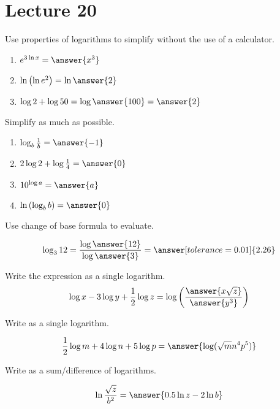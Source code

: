 \documentclass{ximera}
\begin{document}
 \section{Lecture 20}
 
  \begin{problem}\label{prob:160hom8prob1} 
Use properties of logarithms to simplify without the use of a calculator.
\begin{enumerate}
    \item $e^{3\ln x}=\answer{x^3}$
    \item $\ln\left(\ln e^2\right)=\ln\answer{2}$
    \item $\log 2 +\log 50=\log \answer{100}=\answer{2}$
\end{enumerate}
\end{problem}

\begin{problem}\label{prob:160hom8prob8}
 Simplify as much as possible.
 \begin{enumerate}
     \item $\log_b \frac{1}{b}=\answer{-1}$
     \item $2\log 2+\log\frac{1}{4}=\answer{0}$
     \item $10^{\log a}=\answer{a}$
     \item $\ln\left(\log_b b\right)=\answer{0}$
 \end{enumerate}
 \end{problem}

\begin{problem}\label{prob:160hom8prob2}
Use change of base formula to evaluate. 

$$\log_3 12=\frac{\log\answer{12}}{\log\answer{3}}=\answer[tolerance=0.01]{2.26}$$
\end{problem}

\begin{problem}\label{prob:160hom8prob3}
Write the expression as a single logarithm.
$$\log x-3\log y+\frac{1}{2}\log z=\log\left(\frac{\answer{x\sqrt{z}}}{\answer{y^3}}\right)$$
\end{problem}

\begin{problem}\label{prob:160hom8prob10}
 Write as a single logarithm.
 
 $$\frac{1}{2}\log m+4\log n+5\log p=\answer{\log(\sqrt{m}n^4p^5)}$$
 \end{problem}
 
 \begin{problem}\label{prob:160hom8prob11}
 Write as a sum/difference of logarithms.
 
 $$\ln \frac{\sqrt{z}}{b^2}=\answer{0.5\ln z-2\ln b}$$
 \end{problem}
 

 
\end{document}
